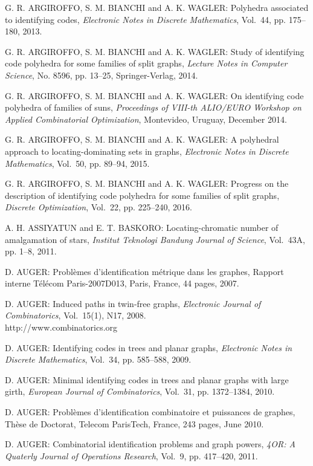\begin{thebibliography}{999}
G. R. ARGIROFFO, S. M. BIANCHI and A. K. WAGLER: Polyhedra associated to identifying codes, {\it Electronic Notes in Discrete Mathematics}, Vol.~44, pp. 175--180, 2013.

G. R. ARGIROFFO, S. M. BIANCHI and A. K. WAGLER: Study of identifying code polyhedra for some families of split graphs, {\it Lecture Notes in Computer Science}, No. 8596, pp. 13--25, Springer-Verlag, 2014.

G. R. ARGIROFFO, S. M. BIANCHI and A. K. WAGLER: On identifying code polyhedra of families of suns, {\it Proceedings of VIII-th ALIO/EURO Workshop on Applied Combinatorial Optimization}, Montevideo, Uruguay, December 2014.

G. R. ARGIROFFO, S. M. BIANCHI and A. K. WAGLER: A polyhedral approach to locating-dominating sets in graphs, {\it Electronic Notes in Discrete Mathematics},  Vol.~50, pp. 89--94, 2015. 

G. R. ARGIROFFO, S. M. BIANCHI and A. K. WAGLER: Progress on the description of identifying code polyhedra for some families of split graphs, {\it Discrete Optimization}, Vol.~22, pp. 225--240,  2016.

A. H. ASSIYATUN and E. T. BASKORO: Locating-chromatic number of amalgamation of stars, {\it Institut Teknologi Bandung Journal of Science}, Vol.~43A, pp. 1--8, 2011.

D. AUGER: Probl\`emes d'identification m\'etrique dans les graphes, Rapport interne T\'el\'ecom Paris-2007D013, Paris, France, 44 pages, 2007.

D. AUGER: Induced paths in twin-free graphs, {\it Electronic Journal of Combinatorics}, Vol.~15(1), N17, 2008.\\
http://www.combinatorics.org

D. AUGER: Identifying codes in trees and planar graphs, {\it Electronic Notes in Discrete Mathematics}, Vol.~34, pp. 585--588, 2009.

D. AUGER: Minimal identifying codes in trees and planar graphs with large girth, {\it European Journal of Combinatorics}, Vol.~31, pp. 1372--1384, 2010.

D. AUGER: Probl\`emes d'identification combinatoire et puissances de graphes, Th\`ese de
Doctorat, Telecom ParisTech, France, 243 pages, June 2010.

D. AUGER: Combinatorial identification problems and graph powers, {\it 4OR: A Quaterly Journal of Operations Research}, Vol.~9, pp. 417--420, 2011.


\end{thebibliography}
